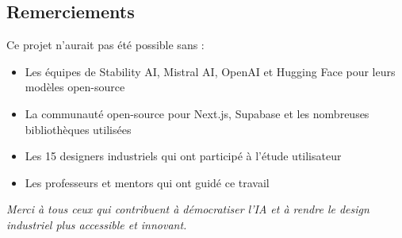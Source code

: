 \subsection{Remerciements}

Ce projet n'aurait pas été possible sans :

\begin{itemize}
    \item Les équipes de Stability AI, Mistral AI, OpenAI et Hugging Face pour leurs modèles open-source
    \item La communauté open-source pour Next.js, Supabase et les nombreuses bibliothèques utilisées
    \item Les 15 designers industriels qui ont participé à l'étude utilisateur
    \item Les professeurs et mentors qui ont guidé ce travail
\end{itemize}

\vspace{1cm}

\begin{center}
\textit{Merci à tous ceux qui contribuent à démocratiser l'IA et à rendre le design industriel plus accessible et innovant.}
\end{center}
